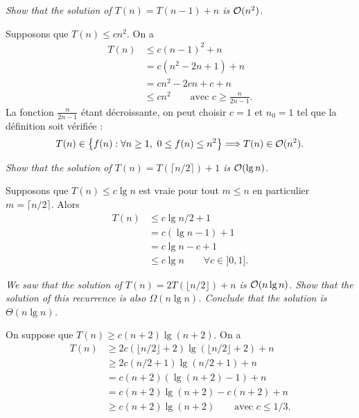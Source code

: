 \begin{description}
   {\itshape Show that the solution of $T(n) = T(n-1) + n$ is $\mathcal{O}(n^2)$.}

    \begin{ex}
      Supposons que $T(n) \le cn^2$. On a 
      \begin{align*}
        T(n) &\le c(n-1)^2 + n\\
        &= c(n^2-2n+1)+n\\
        &= cn^2 - 2cn + c + n\\
        &\le cn^2 \quad\quad \textrm{avec }c \ge \frac{n}{2n-1}.
      \end{align*}
      La fonction $\frac{n}{2n-1}$ \'etant d\'ecroissante, on peut choisir $c = 1$ et $n_0 = 1$ tel que la d\'efinition soit v\'erifi\'ee : 
      \begin{align*}
        T(n) \in \left\{ f(n) : \forall n \ge 1,~ 0 \le f(n) \le n^2 \right\}  \Longrightarrow T(n) \in \mathcal{O}(n^2).
      \end{align*}

    \end{ex}

   {\itshape Show that the solution of $T(n) = T(\lceil n/2 \rceil)+1$ is $\mathcal{O}(\lg n)$.}

    \begin{ex}
      Supposons que $T(n) \le c\lg n$ est vraie pour tout $m \le n$ en particulier ${m = \lceil n/2 \rceil}$. Alors 
      \begin{align*}
        T(n) &\le c\lg n/2 + 1\\
        &= c(\lg n - 1) + 1\\
        &= c \lg n -c + 1\\
        &\le c\lg n \quad\quad \forall c \in ]0, 1].
      \end{align*}
    \end{ex}

   {\itshape We saw that the solution of $T(n) = 2T(\lfloor n/2 \rfloor) + n$ is $\mathcal{O}(n \lg n)$. Show that the solution of this recurrence is also $\Omega(n \lg n)$. Conclude that the solution is $\Theta(n \lg n)$.}
  \begin{ex} %
    On suppose que $T(n) \ge c(n+2)\lg(n+2)$. On a 
    \begin{align*}
      T(n) &\ge 2c(\lfloor n/2\rfloor+2)\lg(\lfloor n/2\rfloor+2) + n\\
        &\ge 2c(n/2+1)\lg(n/2+1)+n \\
        &= c(n+2)(\lg(n+2)-1)+n\\
        &= c(n+2)\lg(n+2)-c(n+2)+n\\
        &\ge c(n+2)\lg(n+2) \quad\quad \textrm{avec } c \le 1/3. 
    \end{align*}


\end{ex}
\end{description}
